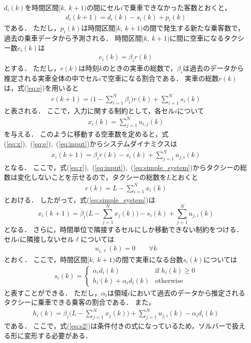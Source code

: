 \documentclass[a4j,10pt,twocolumn]{paper}
\begin{document}
$d_i(k)$を時間区間$[k,\ k+1)$の間にセル$i$で乗車できなかった客数とおくと，
\begin{align}
 d_i(k+1) = d_i(k)-s_i(k)+p_i(k)
\end{align}
である．
ただし，$p_i(k)$は時間区間$[k,\ k+1)$の間で発生する新たな乗客数で，過去の乗車データから予測される．
時間区間$[k,\ k+1)$に間に空車になるタクシー数$e_i(k)$は
\begin{align}
 e_i(k)=\beta_{i}r(k) \label{eq:e}
\end{align}
とする．
ただし，$r(k)$は時刻$k$のときの実車の総数で，$\beta_{i}$は過去のデータから推定される実車全体の中でセル$i$で空車になる割合である．
実車の総数$r(k)$は，式(\ref{eq:e})を用いると
\begin{align}
 r(k+1) = \bigg(1-\sum_{i=1}^{N}\beta_i\bigg)r(k)+\sum_{i=1}^{N}s_i(k) \label{eq:r}
\end{align}
と表される．
ここで，入力に関する制約として，各セル$i$について
\begin{align}
 x_i(k)=\sum_{j=1}^{N}u_{i,j}(k) \label{eq:input}
\end{align}
を与える．
このように移動する空車数を定めると，式(\ref{eq:x}),\ (\ref{eq:e}),\ (\ref{eq:input})からシステムダイナミクスは
\begin{align}
 x_i(k+1)=\beta_i r(k)-s_i(k)+\sum_{j=1}^{N} u_{j,i}(k) \label{eq:simple_system}
\end{align}
となる．
ここで，式(\ref{eq:r}),\ (\ref{eq:input}),\ (\ref{eq:simple_system})からタクシーの総数は変化しないことを示せるので，タクシーの総数を$L$とおくと
\begin{align}
 r(k)= L-\sum_{i=1}^{N}x_i(k) \label{eq:r_new}
\end{align}
とおける．
したがって，式(\ref{eq:simple_system})は
\begin{equation}
x_i(k+1)=\beta_i \bigg(L-\sum_{j=1}^{N} x_j(k) \bigg) -s_i(k)+\sum_{j=1}^{N} u_{j,i}(k) \label{eq:simple_system2}
\end{equation}
となる．
さらに，時間単位で隣接するセルにしか移動できない制約をつける．
セル$i$に隣接しないセル$\ell$については
\begin{align}
 u_{i, \ell}(k)=0 \qquad  \forall k \label{eq:u_seiyaku}
\end{align}
とおく．
ここで，時間区間$[k,\ k+1)$の間で実車になる台数$s_i(k)$については
\begin{align}
 s_i(k)=\left\{
\begin{array}{ll}
 \alpha_i d_i(k) & \mbox{if }h_i(k) \geq 0 \\
h_i(k)+\alpha_i d_i(k) & \mbox{otherwise}
\end{array}\right. \label{eq:s2}
\end{align}
と表すことができる．
ただし，$\alpha_i$は領域$i$において過去のデータから推定されるタクシーに乗車できる乗客の割合である．
また，
\begin{align}
 h_i(k)=\beta_i \bigg( L-\sum_{j=1}^{N}x_j(k)\bigg) +\sum_{j=1}^{N}u_{j,i}(k) -\alpha_i d_i(k) \label{eq:h}
\end{align}
である．
ここで，式(\ref{eq:s2})は条件付きの式になっているため，ソルバーで扱える形に変形する必要がある．
\end{document}
